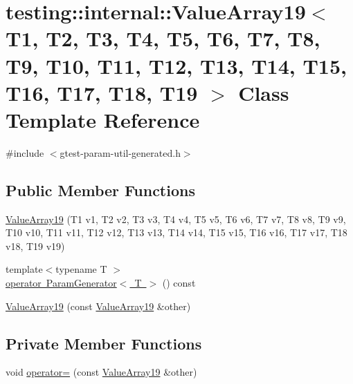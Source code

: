 \hypertarget{classtesting_1_1internal_1_1_value_array19}{}\section{testing\+::internal\+::Value\+Array19$<$ T1, T2, T3, T4, T5, T6, T7, T8, T9, T10, T11, T12, T13, T14, T15, T16, T17, T18, T19 $>$ Class Template Reference}
\label{classtesting_1_1internal_1_1_value_array19}


{\ttfamily \#include $<$gtest-\/param-\/util-\/generated.\+h$>$}

\subsection*{Public Member Functions}
\begin{DoxyCompactItemize}
\item 
\mbox{\hyperlink{classtesting_1_1internal_1_1_value_array19_a1ffcdacd1ffb1d6718187a66458c09e2}{Value\+Array19}} (T1 v1, T2 v2, T3 v3, T4 v4, T5 v5, T6 v6, T7 v7, T8 v8, T9 v9, T10 v10, T11 v11, T12 v12, T13 v13, T14 v14, T15 v15, T16 v16, T17 v17, T18 v18, T19 v19)
\item 
{\footnotesize template$<$typename T $>$ }\\\mbox{\hyperlink{classtesting_1_1internal_1_1_value_array19_a8ddd6c1de46e25310cf844895c7c8cf6}{operator Param\+Generator$<$ T $>$}} () const
\item 
\mbox{\hyperlink{classtesting_1_1internal_1_1_value_array19_a1029ebc5d39633e2fb278e051d0ec1d0}{Value\+Array19}} (const \mbox{\hyperlink{classtesting_1_1internal_1_1_value_array19}{Value\+Array19}} \&other)
\end{DoxyCompactItemize}
\subsection*{Private Member Functions}
\begin{DoxyCompactItemize}
\item 
void \mbox{\hyperlink{classtesting_1_1internal_1_1_value_array19_ae7dce5c33d0426de645afd700e1d432d}{operator=}} (const \mbox{\hyperlink{classtesting_1_1internal_1_1_value_array19}{Value\+Array19}} \&other)
\end{DoxyCompactItemize}

